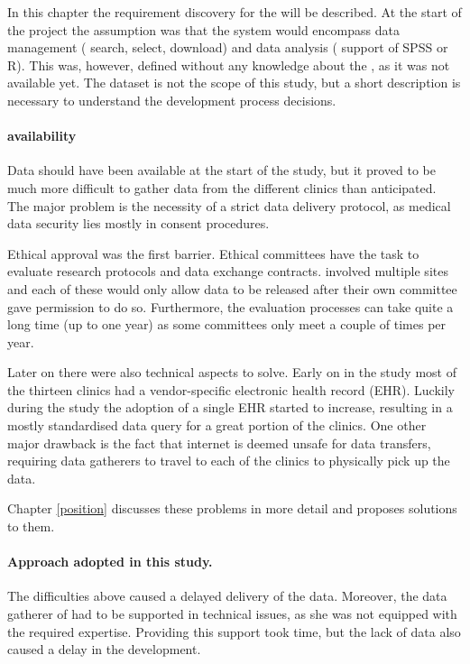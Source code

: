 In this chapter the requirement discovery for the \ivfsystem{} will be described.
At the start of the project the assumption was that the system would encompass data management (\eg{} search, select, download) and data analysis (\eg{} support of SPSS or R).
This was, however, defined without any knowledge about the \projectdata{}, as it was not available yet.
The dataset is not the scope of this study, but a short description is necessary to understand the development process decisions.

\paragraph{\projectdata{} availability}
Data should have been available at the start of the study, but it proved to be much more difficult to gather data from the different clinics than anticipated.
The major problem is the necessity of a strict data delivery protocol, as medical data security lies mostly in consent procedures.

Ethical approval was the first barrier. Ethical committees have the task to evaluate research protocols and data exchange contracts.
\project{} involved multiple sites and each of these would only allow data to be released after their own committee gave permission to do so.
Furthermore, the evaluation processes can take quite a long time (up to one year) as some committees only meet a couple of times per year.

Later on there were also technical aspects to solve.
Early on in the study most of the thirteen clinics had a vendor-specific electronic health record (EHR).
Luckily during the study the adoption of a single EHR started to increase, resulting in a mostly standardised data query for a great portion of the clinics.
One other major drawback is the fact that internet is deemed unsafe for data transfers, requiring data gatherers to travel to each of the clinics to physically pick up the data.

Chapter \ref{position} discusses these problems in more detail and  proposes solutions to them.

\paragraph{Approach adopted in this study.}
The difficulties above caused a delayed delivery of the data. Moreover,
the data gatherer of \project{} had to be supported in technical issues, as she was not equipped with the required expertise. 
Providing this support took time, but the lack of data also caused a delay in the \ivfsystem{} development.

